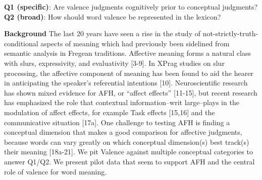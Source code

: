 
\begin{tcolorbox}[colback=white]
\centering
\textbf{Q1 (specific)}: Are valence judgments cognitively prior to conceptual judgments? \\ 
\textbf{Q2 (broad)}: How should word valence be represented in the lexicon?
\end{tcolorbox}

\noindent \textbf{Background}
The last 20 years have seen a rise in the study of not-strictly-truth-conditional aspects of meaning which had previously been sidelined from semantic analysis in Fregean traditions. Affective meaning forms a natural class with slurs, expressivity, and evaluativity [3-9]. In XPrag studies on slur processing, the affective component of meaning has been found to aid the hearer in anticipating the speaker's referential intentions [10]. Neuroscientific research has shown mixed evidence for AFH, or ``affect effects'' [11-15], but recent research has emphasized the role that contextual information--writ large--plays in the modulation of affect effects, for example Task effects [15,16] and the communicative situation [17a]. One challenge to testing AFH is finding a conceptual dimension that makes a good comparison for affective judgments, because words can vary greatly on which conceptual dimension(s) best track(s) their meaning [18a-21]. We pit Valence against multiple conceptual categories to answer Q1/Q2. We present pilot data that seem to support AFH and the central role of valence for word meaning.\\


